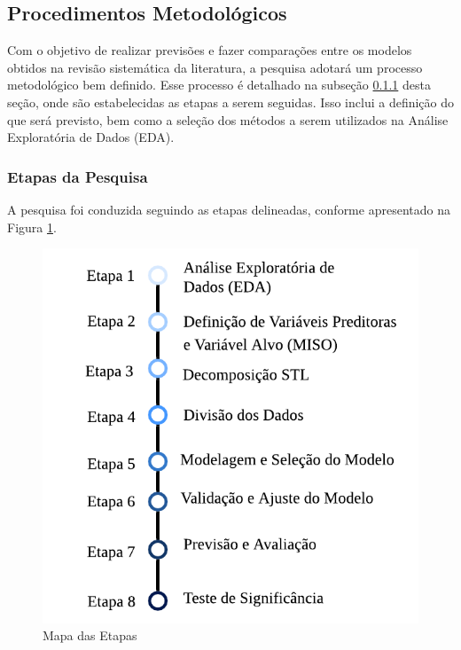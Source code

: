 

\subsection{Procedimentos Metodol{\'o}gicos} \label{subsec:metod}

Com o objetivo de realizar previsões e fazer comparações entre os modelos obtidos na revisão sistemática da literatura, a pesquisa adotará um processo metodológico bem definido. Esse processo é detalhado na subseção \ref{subsubsec:etp} desta seção, onde são estabelecidas as etapas a serem seguidas. Isso inclui a definição do que será previsto, bem como a seleção dos métodos a serem utilizados na Análise Exploratória de Dados (EDA).
   

\subsubsection{Etapas da Pesquisa}\label{subsubsec:etp}


A pesquisa foi conduzida seguindo as etapas delineadas, conforme apresentado na Figura \ref{fig:etapas}.

\begin{figure}[!htb]
	\centering
	\caption{Mapa das Etapas}
	\label{fig:etapas}
	\includegraphics[width=0.7\linewidth]{Introducao/Figuras/Etapas}
	
	
\end{figure}

